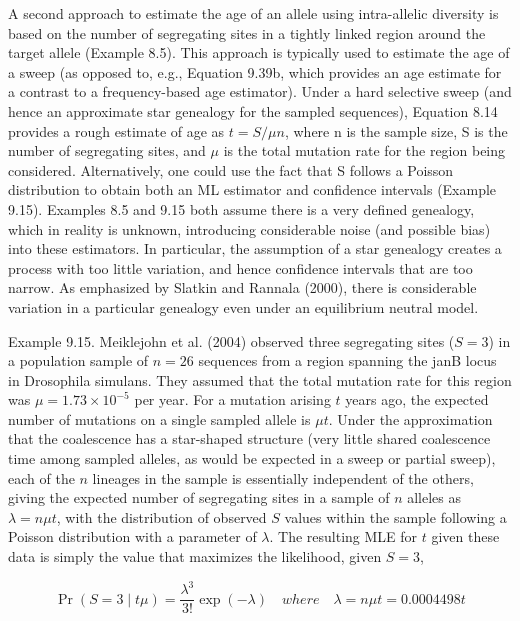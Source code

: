 \documentclass{article}
\begin{document}
A second approach to estimate the age of an allele using intra-allelic diversity is based on the number of segregating sites in a tightly linked region around the target allele (Example 8.5). This approach is typically used to estimate the age of a sweep (as opposed to, e.g., Equation 9.39b, which provides an age estimate for a contrast to a frequency-based age estimator). Under a hard selective sweep (and hence an approximate star genealogy for the sampled sequences), Equation 8.14 provides a rough estimate of age as  $ t = S/\mu n $, where n is the sample size, S is the number of segregating sites, and  $ \mu $ is the total mutation rate for the region being considered. Alternatively, one could use the fact that S follows a Poisson distribution to obtain both an ML estimator and confidence intervals (Example 9.15). Examples 8.5 and 9.15 both assume there is a very defined genealogy, which in reality is unknown, introducing considerable noise (and possible bias) into these estimators. In particular, the assumption of a star genealogy creates a process with too little variation, and hence confidence intervals that are too narrow. As emphasized by Slatkin and Rannala (2000), there is considerable variation in a particular genealogy even under an equilibrium neutral model.

Example 9.15. Meiklejohn et al. (2004) observed three segregating sites ($S = 3$) in a population sample of $n = 26$ sequences from a region spanning the janB locus in Drosophila simulans. They assumed that the total mutation rate for this region was $\mu = 1.73 \times 10^{-5}$ per year. For a mutation arising $t$ years ago, the expected number of mutations on a single sampled allele is $\mu t$. Under the approximation that the coalescence has a star-shaped structure (very little shared coalescence time among sampled alleles, as would be expected in a sweep or partial sweep), each of the $n$ lineages in the sample is essentially independent of the others, giving the expected number of segregating sites in a sample of $n$ alleles as $\lambda = n\mu t$, with the distribution of observed $S$ values within the sample following a Poisson distribution with a parameter of $\lambda$. The resulting MLE for $t$ given these data is simply the value that maximizes the likelihood, given $S = 3$,

\begin{equation}
\Pr(S=3\mid t\mu)=\frac{\lambda^{3}}{3!}\exp(-\lambda)\quad where\quad\lambda=n\mu t=0.0004498t
\end{equation}
\end{document}

